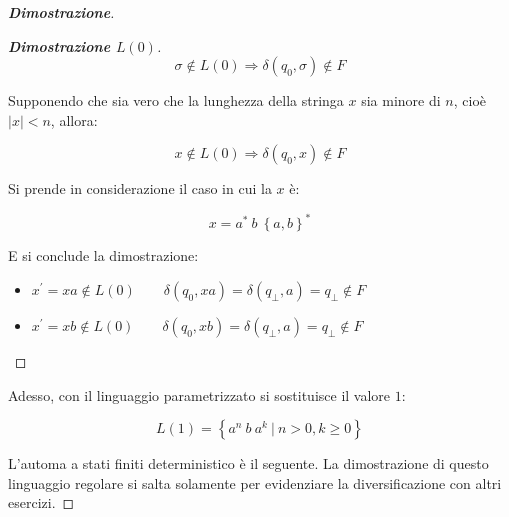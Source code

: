 \documentclass[a4paper]{article}
\begin{document}
\begin{proof}[\textcolor{Blue3}{\textbf{Dimostrazione}}]
\begin{proof}[\textbf{Dimostrazione $L\left(0\right)$}]
			\begin{equation*}
				\sigma \notin L\left(0\right) \Longrightarrow \delta\left(q_{0}, \sigma\right) \notin F
			\end{equation*}
		
			\noindent
			Supponendo che sia vero che la lunghezza della stringa $x$ sia minore di $n$, cioè $|x| < n$, allora:
			
			\begin{equation*}
				x \notin L\left(0\right) \Longrightarrow \delta\left(q_{0}, x\right) \notin F
			\end{equation*}
		
			\noindent
			Si prende in considerazione il caso in cui la $x$ è:
			
			\begin{equation*}
				x = a^{*} \: b \: \left\{a,b\right\}^{*}
			\end{equation*}
			
			\noindent
			E si conclude la dimostrazione:
			
			\begin{itemize}[label=-]
				\item $x^{'} = xa \notin L\left(0\right) \hspace{2em} \delta\left(q_{0}, xa\right) = \delta\left(q_{\bot}, a\right) = q_{\bot} \notin F$
				
				\item $x^{'} = xb \notin L\left(0\right) \hspace{2em} \delta\left(q_{0}, xb\right) = \delta\left(q_{\bot}, a\right) = q_{\bot} \notin F$
			\end{itemize}
		\end{proof}
	
		\newpage
		
		\noindent
		Adesso, con il linguaggio parametrizzato si sostituisce il valore $1$:
		
		\begin{equation*}
			L\left(1\right) = \left\{a^{n} \: b \: a^{k} \: \left| \: n > 0, k \ge 0 \right.\right\}
		\end{equation*}
	
		\noindent
		L'automa a stati finiti deterministico è il seguente. La dimostrazione di questo linguaggio regolare si salta solamente per evidenziare la diversificazione con altri esercizi.
		

\end{proof}
\end{document}

